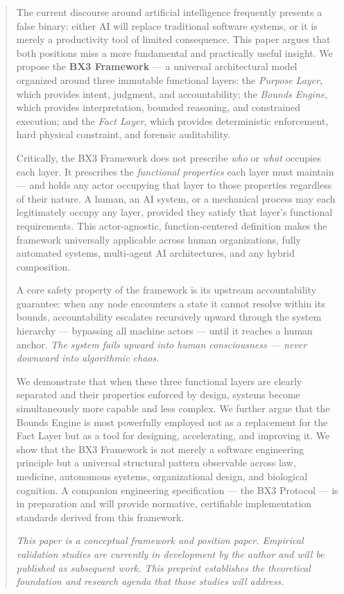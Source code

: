 \documentclass[12pt]{article}
\begin{document}
\begin{abstract}
\noindent
The current discourse around artificial intelligence frequently presents a false binary: either AI will replace traditional software systems, or it is merely a productivity tool of limited consequence. This paper argues that both positions miss a more fundamental and practically useful insight. We propose the \textbf{BX3 Framework} --- a universal architectural model organized around three immutable functional layers: the \textit{Purpose Layer}, which provides intent, judgment, and accountability; the \textit{Bounds Engine}, which provides interpretation, bounded reasoning, and constrained execution; and the \textit{Fact Layer}, which provides deterministic enforcement, hard physical constraint, and forensic auditability.

Critically, the BX3 Framework does not prescribe \textit{who} or \textit{what} occupies each layer. It prescribes the \textit{functional properties} each layer must maintain --- and holds any actor occupying that layer to those properties regardless of their nature. A human, an AI system, or a mechanical process may each legitimately occupy any layer, provided they satisfy that layer's functional requirements. This actor-agnostic, function-centered definition makes the framework universally applicable across human organizations, fully automated systems, multi-agent AI architectures, and any hybrid composition.

A core safety property of the framework is its upstream accountability guarantee: when any node encounters a state it cannot resolve within its bounds, accountability escalates recursively upward through the system hierarchy --- bypassing all machine actors --- until it reaches a human anchor. \textit{The system fails upward into human consciousness --- never downward into algorithmic chaos.}

We demonstrate that when these three functional layers are clearly separated and their properties enforced by design, systems become simultaneously more capable and less complex. We further argue that the Bounds Engine is most powerfully employed not as a replacement for the Fact Layer but as a tool for designing, accelerating, and improving it. We show that the BX3 Framework is not merely a software engineering principle but a universal structural pattern observable across law, medicine, autonomous systems, organizational design, and biological cognition. A companion engineering specification --- the BX3 Protocol --- is in preparation and will provide normative, certifiable implementation standards derived from this framework.

\vspace{0.5em}
\noindent\textit{This paper is a conceptual framework and position paper. Empirical validation studies are currently in development by the author and will be published as subsequent work. This preprint establishes the theoretical foundation and research agenda that those studies will address.}
\end{abstract}
\end{document}
